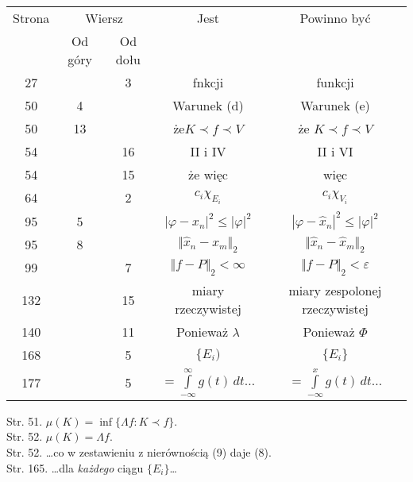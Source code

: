 \documentclass[a4paper,11pt]{article}
\begin{document}
\begin{center}

  \begin{tabular}{|c|c|c|c|c|}
    \hline
    Strona & \multicolumn{2}{c|}{Wiersz} & Jest
                              & Powinno być \\ \cline{2-3}
    & Od góry & Od dołu & & \\
    \hline
    27  & &  3 & fnkcji & funkcji \\
    50  &  4 &  & Warunek (d) & Warunek (e) \\
    50  & 13 &  & że$K \prec f  \prec V$ & że $K \prec f  \prec V$ \\
    54  & & 16 & II i IV & II i VI \\
    54  & & 15 & że więc & więc \\
    64  & &  2 & $c_{ i } \chi_{ E_{ i } }$ & $c_{ i } \chi_{ V_{ i } }$ \\
    95  &  5 & & $| \varphi - x_{ n } |^{ 2 } \leq | \varphi |^{ 2 }$
           & $| \varphi - \hat{ x }_{ n } |^{ 2 } \leq | \varphi |^{ 2 }$ \\
    95  &  8 & & $\Vert \hat{ x }_{ n } - x_{ m } \Vert_{ 2 }$
           & $\Vert \hat{ x }_{ n } - \hat{ x }_{ m } \Vert_{ 2 }$ \\
    99  & &  7 & $\Vert f - P \Vert_{ 2 } < \infty$
           & $\Vert f - P \Vert_{ 2 } < \varepsilon$ \\
    132 &  & 15 & miary rzeczywistej & miary zespolonej rzeczywistej \\
    140 & & 11 & Ponieważ $\lambda$ & Ponieważ $\Phi$ \\
    168 & &  5 & $\{ E_{ i } )$ & $\{ E_{ i } \}$ \\
    177 & &  5 & $= \int\limits^{ \infty }_{ -\infty } g( t ) \, dt \ldots$
           & $= \int\limits^{ x }_{ -\infty } g( t ) \, dt \ldots$ \\
    \hline
  \end{tabular}

\end{center}

\vspace{\spaceTwo}


Str. 51. $\mu( K ) = \inf\{ \Lambda f : K \prec f \}$. \\
Str. 52. $\mu( K ) = \Lambda f$. \\
Str. 52. \ldots co w zestawieniu z nierównością (9) daje (8). \\
Str. 165. \ldots dla \textit{każdego} ciągu $\{ E_{ i } \}$\ldots
\end{document}
